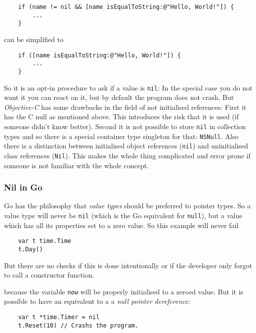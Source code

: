 \documentclass[12pt,a4paper]{report}
\begin{document}
\begin{verbatim}
    if (name != nil && [name isEqualToString:@"Hello, World!"]) {
        ... 
    }
\end{verbatim}

\noindent can be simplified to

\begin{verbatim}
    if ([name isEqualToString:@"Hello, World!"]) { 
        ... 
    }
\end{verbatim}

\noindent So it is an opt-in procedure to ask if a value is \texttt{nil}: In the special case you do not want it you can react on it, but by default the program does not crash. But \textit{Objective-C} has some drawbacks in the field of not initialised references: First it has the C null as mentioned above. This introduces the risk that it is used (if someone didn't know better). Second it is not possible to store \texttt{nil} in collection types and so there is a special container type singleton for that: \texttt{NSNull}. Also there is a distinction between initialised object references (\texttt{nil}) and uninitialised class references (\texttt{Nil}). This makes the whole thing complicated and error prone if someone is not familiar with the whole concept.

\subsubsection{Nil in Go}
Go has the philosophy that \textit{value types} should be preferred to pointer types. So a value type will never be \texttt{nil} (which is the Go equivalent for \texttt{null}), but a value which has all its properties set to a zero value\cite{golang-spec}. So this example will never fail

\begin{verbatim}
    var t time.Time
    t.Day()
\end{verbatim}

But there are no checks if this is done intentionally or if the developer only forgot to call a constructor function.

because the variable \texttt{now} will be properly initialised to a zeroed value. But it is possible to have an equivalent to a a \textit{null pointer dereference}:

\begin{verbatim}
    var t *time.Timer = nil
    t.Reset(10) // Crashs the program.
\end{verbatim}
\end{document}
